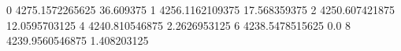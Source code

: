 0 4275.1572265625 36.609375
1 4256.1162109375 17.568359375
2 4250.607421875 12.0595703125
4 4240.810546875 2.2626953125
6 4238.5478515625 0.0
8 4239.9560546875 1.408203125
